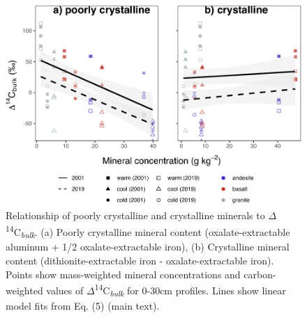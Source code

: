 \documentclass[english,man,floatsintext]{apa6}
\begin{document}
\begin{figure}

{\centering \includegraphics{sra-blk-inc-SI_files/figure-latex/min-blk30-plot-1} 

}

\caption{Relationship of poorly crystalline and crystalline minerals to \(\Delta\)\textsuperscript{14}C\textsubscript{\emph{bulk}}. (a) Poorly crystalline mineral content (oxalate-extractable aluminum + 1/2 oxalate-extractable iron), (b) Crystalline mineral content (dithionite-extractable iron - oxalate-extractable iron). Points show mass-weighted mineral concentrations and carbon-weighted values of \(\Delta\)\textsuperscript{14}C\textsubscript{\emph{bulk}} for 0-30cm profiles. Lines show linear model fits from Eq. (5) (main text).}\label{fig:min-blk30-plot}
\end{figure}
\end{document}
